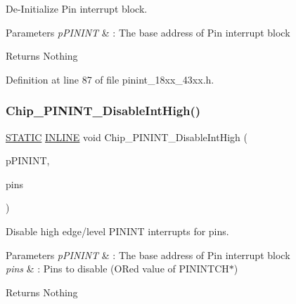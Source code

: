 De-\/\+Initialize Pin interrupt block. 


\begin{DoxyParams}{Parameters}
{\em p\+P\+I\+N\+I\+NT} & \+: The base address of Pin interrupt block \\
\hline
\end{DoxyParams}
\begin{DoxyReturn}{Returns}
Nothing 
\end{DoxyReturn}


Definition at line 87 of file pinint\+\_\+18xx\+\_\+43xx.\+h.

\mbox{\label{group___p_i_n_i_n_t__18_x_x__43_x_x_ga9e337046dac41a61cfcfaa4059b403a9}} 
\subsubsection{\texorpdfstring{Chip\+\_\+\+P\+I\+N\+I\+N\+T\+\_\+\+Disable\+Int\+High()}{Chip\_PININT\_DisableIntHigh()}}
{\footnotesize\ttfamily \hyperlink{group___l_p_c___types___public___macros_ga10b2d890d871e1489bb02b7e70d9bdfb}{S\+T\+A\+T\+IC} \hyperlink{spifi__18xx__43xx_8h_a2eb6f9e0395b47b8d5e3eeae4fe0c116}{I\+N\+L\+I\+NE} void Chip\+\_\+\+P\+I\+N\+I\+N\+T\+\_\+\+Disable\+Int\+High (\begin{DoxyParamCaption}\item[{\hyperlink{struct_l_p_c___p_i_n___i_n_t___t}{L\+P\+C\+\_\+\+P\+I\+N\+\_\+\+I\+N\+T\+\_\+T} $\ast$}]{p\+P\+I\+N\+I\+NT,  }\item[{uint32\+\_\+t}]{pins }\end{DoxyParamCaption})}



Disable high edge/level P\+I\+N\+I\+NT interrupts for pins. 


\begin{DoxyParams}{Parameters}
{\em p\+P\+I\+N\+I\+NT} & \+: The base address of Pin interrupt block \\
\hline
{\em pins} & \+: Pins to disable (O\+Red value of P\+I\+N\+I\+N\+T\+C\+H$\ast$) \\
\hline
\end{DoxyParams}
\begin{DoxyReturn}{Returns}
Nothing 
\end{DoxyReturn}


